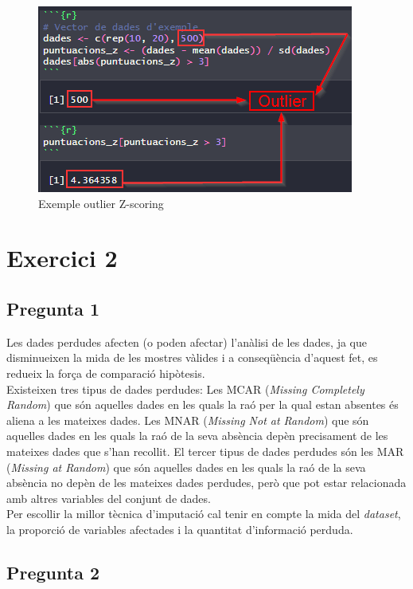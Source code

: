 \documentclass[a4paper,12pt]{report}
\begin{document}
\begin{figure}[h]
    \centering
    \includegraphics[scale=1]{images/z-scoring.png}
    \caption{Exemple outlier Z-scoring}
    \label{fig:zscoring}
\end{figure}
\section*{Exercici 2}
\subsection*{Pregunta 1}
Les dades perdudes afecten (o poden afectar) l'anàlisi de les dades, ja que disminueixen la mida de les mostres vàlides i a conseqüència d'aquest fet, es redueix la força de comparació hipòtesis.\\
Existeixen tres tipus de dades perdudes: Les MCAR (\textit{Missing Completely Random}) que són aquelles dades en les quals la raó per la qual estan absentes és aliena a les mateixes dades. Les MNAR (\textit{Missing Not at Random}) que són aquelles dades en les quals la raó de la seva absència depèn precisament de les mateixes dades que s'han recollit. El tercer tipus de dades perdudes són les MAR (\textit{Missing at Random}) que són aquelles dades en les quals la raó de la seva absència no depèn de les mateixes dades perdudes, però que pot estar relacionada amb altres variables del conjunt de dades.\\
Per escollir la millor tècnica d'imputació cal tenir en compte la mida del \textit{dataset}, la proporció de variables afectades i la quantitat d'informació perduda.
\subsection*{Pregunta 2}
\end{document}
